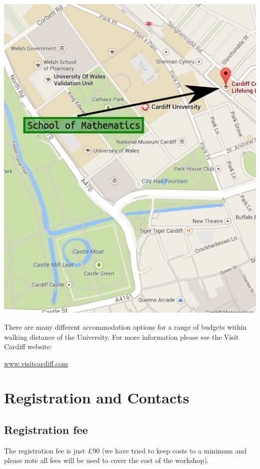 \documentclass {leaflet}
\begin{document}
\begin{center}
\includegraphics[width=.95\textwidth]{./Images/map.png}
\end{center}

\vspace{1cm}

There are many different accommodation options for a range of budgets within walking distance of the University. For more information please see the Visit Cardiff website:
\begin{center}
\url{www.visitcardiff.com}
\end{center}

\newpage
\section{Registration and Contacts}
\subsection{Registration fee}

The registration fee is just \pounds90 (we have tried to keep costs to a minimum and please note all fees will be used to cover the cost of the workshop). \\
\end{document}
